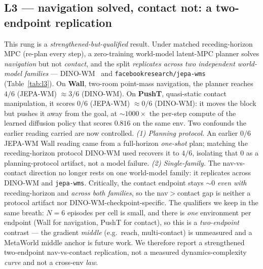 \documentclass[10pt]{article}
\begin{document}
\subsection{L3 --- navigation solved, contact not: a two-endpoint
replication}
\label{sec:l3}
This rung is a \emph{strengthened-but-qualified} result. Under matched
receding-horizon MPC (re-plan every step), a zero-training world-model
latent-MPC planner solves \emph{navigation} but not \emph{contact}, and the
split \emph{replicates across two independent world-model families} ---
DINO-WM~\cite{zhou2024dinowm} and
\texttt{facebookresearch/jepa-wms}~\cite{assran2025vjepa2}
(Table~\ref{tab:l3}). On \textbf{Wall}, two-room point-mass navigation, the
planner reaches $4/6$ (JEPA-WM) $\approx 3/6$ (DINO-WM). On \textbf{PushT},
quasi-static contact manipulation, it scores $0/6$ (JEPA-WM) $\approx 0/6$
(DINO-WM): it moves the block but pushes it away from the goal, at
${\sim}1000\times$ the per-step compute of the learned diffusion policy
that scores $0.816$ on the same env. Two confounds the earlier reading
carried are now controlled. \emph{(1) Planning protocol.} An earlier $0/6$
JEPA-WM Wall reading came from a full-horizon \emph{one-shot} plan; matching
the receding-horizon protocol DINO-WM used recovers it to $4/6$, isolating
that $0$ as a planning-protocol artifact, not a model failure. \emph{(2)
Single-family.} The nav-vs-contact direction no longer rests on one
world-model family: it replicates across DINO-WM and \texttt{jepa-wms}.
Critically, the contact endpoint stays ${\sim}0$ \emph{even with}
receding-horizon and \emph{across both families}, so the nav$>$contact gap
is neither a protocol artifact nor DINO-WM-checkpoint-specific. The
qualifiers we keep in the same breath: $N{=}6$ episodes per cell is small,
and there is \emph{one} environment per endpoint (Wall for navigation, PushT
for contact), so this is a \emph{two-endpoint} contrast --- the gradient
\emph{middle} (e.g.\ reach, multi-contact) is unmeasured and a MetaWorld
middle anchor is future work. We therefore report a strengthened
two-endpoint nav-vs-contact replication, not a measured dynamics-complexity
\emph{curve} and not a cross-env \emph{law}.
\end{document}

